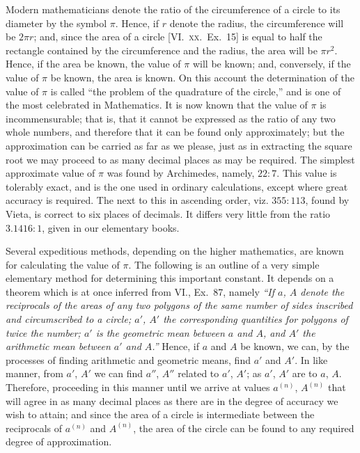 \documentclass[oneside]{book}
\begin{document}
\begin{footnotesize}
Modern mathematicians denote the ratio of the circumference
of a circle to its diameter by the symbol $\pi$. Hence, if $r$ denote
the radius, the circumference will be $2\pi r$; and, since the area of
a circle [VI\@.~\textsc{xx.}\ Ex.~15] is equal to half the rectangle contained
by the circumference and the radius, the area will be $\pi r^2$. Hence,
if the area be known, the value of $\pi$ will be known; and, conversely,
if the value of $\pi$ be known, the area is known. On this
account the determination of the value of $\pi$ is called ``the problem
of the quadrature of the circle,'' and is one of the most celebrated
in Mathematics. It is now known that the value of $\pi$ is incommensurable;
that is, that it cannot be expressed as the ratio of
any two whole numbers, and therefore that it can be found only
approximately; but the approximation can be carried as far as we
please, just as in extracting the square root we may proceed to as
many decimal places as may be required. The simplest approximate
value of $\pi$ was found by Archimedes, namely, $22: 7$. This
value is tolerably exact, and is the one used in ordinary calculations,
except where great accuracy is required. The next to
this in ascending order, viz. $355: 113$, found by Vieta, is correct
to six places of decimals. It differs very little from the ratio
$3.1416:1$, given in our elementary books.

Several expeditious methods, depending on the higher mathematics,
are known for calculating the value of $\pi$. The following
is an outline of a very simple elementary method for determining
this important constant. It depends on a theorem which is at
once inferred from VI\@., Ex.~87, namely \textit{``If $a$, $A$ denote the reciprocals
of the areas of any two polygons of the same number of sides
inscribed and circumscribed to a circle; $a'$, $A'$ the corresponding quantities
for polygons of twice the number; $a'$ is the geometric mean
between $a $
and $A$, and $A'$ the arithmetic mean between $a'$ and $A$.''}
Hence, if $a$ and $A$ be known, we can, by the processes of finding
arithmetic and geometric means, find $a'$ and $A'$. In like manner,
from $a'$, $A'$ we can find $a''$, $A''$ related to $a'$, $A'$; as $a'$, $A'$ are to
$a$, $A$. Therefore, proceeding in this manner until we arrive at
values $a^{(n)}$, $A^{(n)}$ that will agree in as many decimal places as
there are in the degree of accuracy we wish to attain; and since
the area of a circle is intermediate between the reciprocals of
$a^{(n)}$ and $A^{(n)}$, the area of the circle can be found to any required
degree of approximation.


\end{footnotesize}
\end{document}
